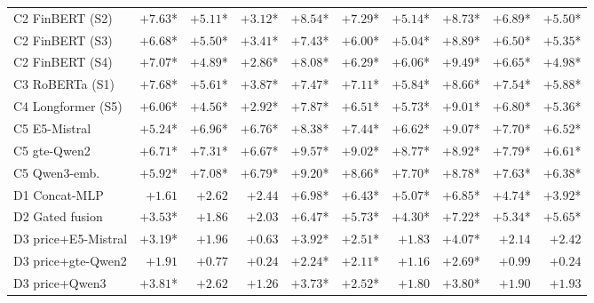 \begin{table}[p]
\begin{tabular}{@{}lrrrrrrrrr@{}}
C2 FinBERT (S2)        & $+7.63$* & $+5.11$* & $+3.12$* & $+8.54$* & $+7.29$* & $+5.14$* & $+8.73$* & $+6.89$* & $+5.50$* \\
C2 FinBERT (S3)        & $+6.68$* & $+5.50$* & $+3.41$* & $+7.43$* & $+6.00$* & $+5.04$* & $+8.89$* & $+6.50$* & $+5.35$* \\
C2 FinBERT (S4)        & $+7.07$* & $+4.89$* & $+2.86$* & $+8.08$* & $+6.29$* & $+6.06$* & $+9.49$* & $+6.65$* & $+4.98$* \\
C3 RoBERTa (S1)        & $+7.68$* & $+5.61$* & $+3.87$* & $+7.47$* & $+7.11$* & $+5.84$* & $+8.66$* & $+7.54$* & $+5.88$* \\
C4 Longformer (S5)     & $+6.06$* & $+4.56$* & $+2.92$* & $+7.87$* & $+6.51$* & $+5.73$* & $+9.01$* & $+6.80$* & $+5.36$* \\
C5 E5-Mistral          & $+5.24$* & $+6.96$* & $+6.76$* & $+8.38$* & $+7.44$* & $+6.62$* & $+9.07$* & $+7.70$* & $+6.52$* \\
C5 gte-Qwen2           & $+6.71$* & $+7.31$* & $+6.67$* & $+9.57$* & $+9.02$* & $+8.77$* & $+8.92$* & $+7.79$* & $+6.61$* \\
C5 Qwen3-emb.          & $+5.92$* & $+7.08$* & $+6.79$* & $+9.20$* & $+8.66$* & $+7.70$* & $+8.78$* & $+7.63$* & $+6.38$* \\
D1 Concat-MLP          & $+1.61$\phantom{*} & $+2.62$\phantom{*} & $+2.44$\phantom{*} & $+6.98$* & $+6.43$* & $+5.07$* & $+6.85$* & $+4.74$* & $+3.92$* \\
D2 Gated fusion        & $+3.53$* & $+1.86$\phantom{*} & $+2.03$\phantom{*} & $+6.47$* & $+5.73$* & $+4.30$* & $+7.22$* & $+5.34$* & $+5.65$* \\
D3 price+E5-Mistral    & $+3.19$* & $+1.96$\phantom{*} & $+0.63$\phantom{*} & $+3.92$* & $+2.51$* & $+1.83$\phantom{*} & $+4.07$* & $+2.14$\phantom{*} & $+2.42$\phantom{*} \\
D3 price+gte-Qwen2     & $+1.91$\phantom{*} & $+0.77$\phantom{*} & $+0.24$\phantom{*} & $+2.24$* & $+2.11$* & $+1.16$\phantom{*} & $+2.69$* & $+0.99$\phantom{*} & $+0.24$\phantom{*} \\
D3 price+Qwen3         & $+3.81$* & $+2.62$\phantom{*} & $+1.26$\phantom{*} & $+3.73$* & $+2.52$* & $+1.80$\phantom{*} & $+3.80$* & $+1.90$\phantom{*} & $+1.93$\phantom{*} \\
\bottomrule
\end{tabular}
\end{table}

